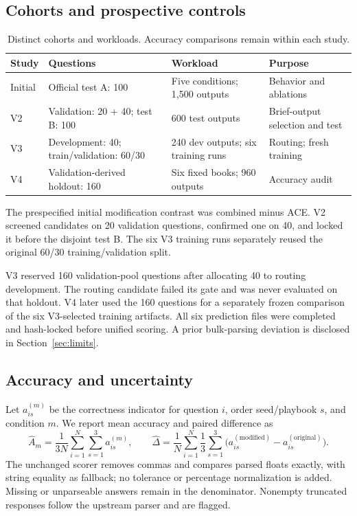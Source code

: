 \documentclass[10pt,a4paper]{article}
\newcommand{\smalltable}{\small\setlength{\tabcolsep}{4pt}}
\begin{document}
\subsection{Cohorts and prospective controls}
\begin{table}[h!]
\centering\smalltable
\begin{tabularx}{\linewidth}{P{20mm}Y Y P{34mm}}
\toprule
Study & Questions & Workload & Purpose \\
\midrule
Initial & Official test A: 100 & Five conditions; 1,500 outputs & Behavior and ablations \\
V2 & Validation: 20 + 40; test B: 100 & 600 test outputs & Brief-output selection and test \\
V3 & Development: 40; train/validation: 60/30 & 240 dev outputs; six training runs & Routing; fresh training \\
V4 & Validation-derived holdout: 160 & Six fixed books; 960 outputs & Accuracy audit \\
\bottomrule
\end{tabularx}
\caption{Distinct cohorts and workloads. Accuracy comparisons remain within each study.}
\end{table}
The prespecified initial modification contrast was combined minus ACE. V2 screened candidates on 20 validation questions, confirmed one on 40, and locked it before the disjoint test B. The six V3 training runs separately reused the original 60/30 training/validation split.

V3 reserved 160 validation-pool questions after allocating 40 to routing development. The routing candidate failed its gate and was never evaluated on that holdout. V4 later used the 160 questions for a separately frozen comparison of the six V3-selected training artifacts. All six prediction files were completed and hash-locked before unified scoring. A prior bulk-parsing deviation is disclosed in Section~\ref{sec:limits}.

\subsection{Accuracy and uncertainty}
Let $a_{is}^{(m)}$ be the correctness indicator for question $i$, order seed/playbook $s$, and condition $m$. We report mean accuracy and paired difference as
\[
\widehat A_m=\frac{1}{3N}\sum_{i=1}^{N}\sum_{s=1}^{3}a_{is}^{(m)},\qquad
\widehat\Delta=\frac{1}{N}\sum_{i=1}^{N}\frac{1}{3}\sum_{s=1}^{3}\big(a_{is}^{(\mathrm{modified})}-a_{is}^{(\mathrm{original})}\big).
\]
The unchanged scorer removes commas and compares parsed floats exactly, with string equality as fallback; no tolerance or percentage normalization is added. Missing or unparseable answers remain in the denominator. Nonempty truncated responses follow the upstream parser and are flagged.
\end{document}
